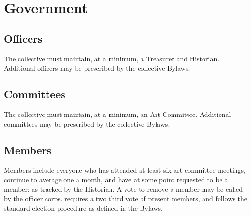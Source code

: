 \chapter{Government}

\section{Officers}\label{sec:officers}
The collective must maintain, at a minimum, a Treasurer and Historian. Additional officers may be prescribed by the collective Bylaws.

\section{Committees}\label{sec:committees}
The collective must maintain, at a minimum, an Art Committee. Additional committees may be prescribed by the collective Bylaws.

\section{Members}\label{sec:members}
Members include everyone who has attended at least six art committee meetings, continue to average one a month, and have at some point requested to be a member; as tracked by the Historian. A vote to remove a member may be called by the officer corps, requires a two third vote of present members, and follows the standard election procedure as defined in the Bylaws.

